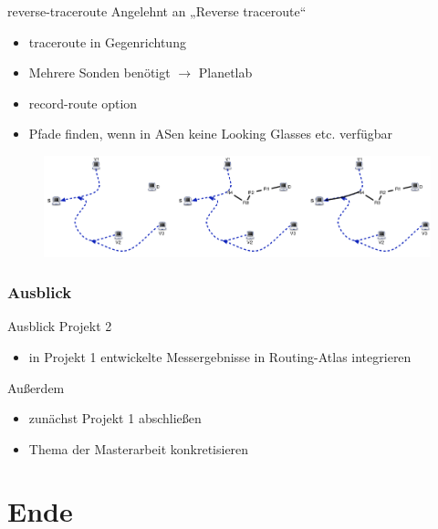 \documentclass[ngerman,compress,svgnames,hyperref={bookmarks},final]{beamer}
\begin{document}
\begin{frame}{reverse-traceroute}
  Angelehnt an „Reverse traceroute“ \cite{Katz-Bassett:2010:RT:1855711.1855726}
  \begin{itemize}
    \item traceroute in Gegenrichtung
    \item Mehrere Sonden benötigt $\rightarrow$ Planetlab
    \item record-route option
    \item Pfade finden, wenn in ASen keine Looking Glasses etc. verfügbar
  \end{itemize}
  \begin{figure}
    \label{reverse_traceroute}
    \includegraphics[width=1\textwidth]{images/reverse_traceroute_overview}
  \end{figure}
\end{frame}

\section{Ausblick}
\begin{frame}{Ausblick}
  Projekt 2
  \begin{itemize}
    \item in Projekt 1 entwickelte Messergebnisse in Routing-Atlas integrieren
  \end{itemize}
  \vspace{0.3cm}
  Außerdem
  \begin{itemize}
    \item zunächst Projekt 1 abschließen
    \item Thema der Masterarbeit konkretisieren
  \end{itemize}
\end{frame}

\part{Ende}
\end{document}
